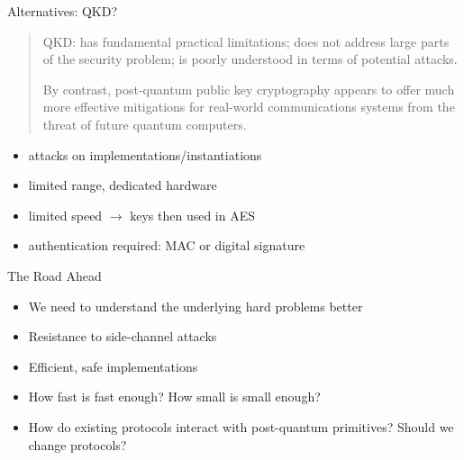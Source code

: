 \documentclass[xcolor=table,10pt,aspectratio=169]{beamer}
\begin{document}
\begin{frame}[label={sec:orgc18aa36}]{Alternatives: QKD?}
\begin{quote}
QKD: has fundamental practical limitations; does not address large parts of the security problem; is poorly understood in terms of potential attacks.

By contrast, post-quantum public key cryptography appears to offer much more effective mitigations for real-world communications systems from the threat of future quantum computers.
\end{quote}

\begin{itemize}
\item attacks on implementations/instantiations
\item limited range, dedicated hardware
\item limited speed \(\rightarrow\) keys then used in AES
\item authentication required: MAC or digital signature
\end{itemize}
\end{frame}

\begin{frame}[label={sec:org0671810}]{The Road Ahead}
\begin{itemize}
\item We need to understand the underlying hard problems better
\item Resistance to side-channel attacks
\item Efficient, safe implementations
\item How fast is fast enough? How small is small enough?
\item How do existing protocols interact with post-quantum primitives? Should we change protocols?
\end{itemize}
\end{frame}
\end{document}
